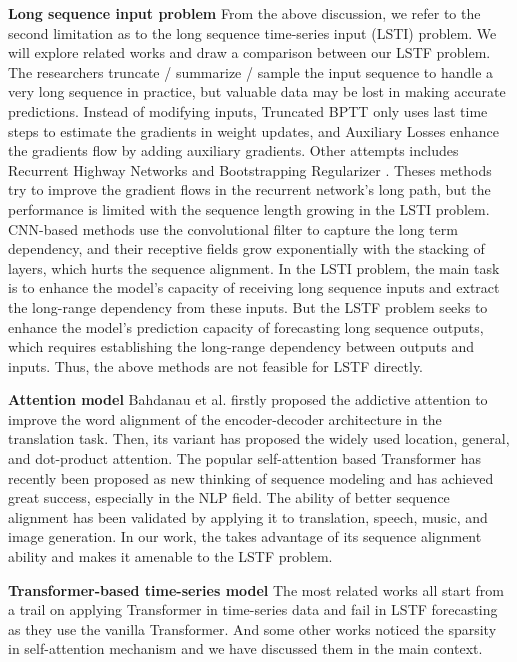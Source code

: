 \begin{appendices}
\textbf{Long sequence input problem} From the above discussion, we refer to the second limitation as to the long sequence time-series input (LSTI) problem. We will explore related works and draw a comparison between our LSTF problem. The researchers truncate / summarize / sample the input sequence to handle a very long sequence in practice, but valuable data may be lost in making accurate predictions. Instead of modifying inputs, Truncated BPTT \cite{aicher2019adaptively} only uses last time steps to estimate the gradients in weight updates, and Auxiliary Losses \cite{trinh2018learning} enhance the gradients flow by adding auxiliary gradients. Other attempts includes Recurrent Highway Networks \cite{zilly2017recurrent} and Bootstrapping Regularizer \cite{cao2019better}. Theses methods try to improve the gradient flows in the recurrent network's long path, but the performance is limited with the sequence length growing in the LSTI problem. CNN-based methods \cite{stoller2019seq,bai2018convolutional} use the convolutional filter to capture the long term dependency, and their receptive fields grow exponentially with the stacking of layers, which hurts the sequence alignment. In the LSTI problem, the main task is to enhance the model's capacity of receiving long sequence inputs and extract the long-range dependency from these inputs. But the LSTF problem seeks to enhance the model's prediction capacity of forecasting long sequence outputs, which requires establishing the long-range dependency between outputs and inputs. Thus, the above methods are not feasible for LSTF directly.

\textbf{Attention model} Bahdanau et al. firstly proposed the addictive attention \cite{bahdanau2014neural} to improve the word alignment of the encoder-decoder architecture in the translation task. Then, its variant \cite{DBLP:conf/emnlp/LuongPM15} has proposed the widely used location, general, and dot-product attention.
The popular self-attention based Transformer \cite{vaswani2017attention} has recently been proposed as new thinking of sequence modeling and has achieved great success, especially in the NLP field. The ability of better sequence alignment has been validated by applying it to translation, speech, music, and image generation. In our work, the {\mn} takes advantage of its sequence alignment ability and makes it amenable to the LSTF problem.

\textbf{Transformer-based time-series model} The most related works \cite{song2018attend,ma2019cdsa,li2019enhancing} all start from a trail on applying Transformer in time-series data and fail in LSTF forecasting as they use the vanilla Transformer. And some other works \cite{child2019generating, li2019enhancing} noticed the sparsity in self-attention mechanism and we have discussed them in the main context.


\end{appendices}
